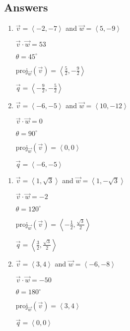 \newpage

\subsection{Answers}

\begin{multicols}{2} \raggedcolumns 

\begin{enumerate}

\item $\vec{v} = \left\langle -2, -7 \right\rangle$ and $\vec{w} = \left\langle 5, -9 \right\rangle$

 $\vec{v} \cdot \vec{w} = 53$

 $\theta =  45^{\circ}$ 

 $\text{proj}_{\vec{w}}(\vec{v}) = \left\langle \frac{5}{2}, -\frac{9}{2} \right\rangle$

 $\vec{q} = \left\langle -\frac{9}{2}, -\frac{5}{2} \right\rangle$
 
 \vfill
 
\item $\vec{v} = \left\langle -6, -5 \right\rangle$ and $\vec{w} = \left\langle 10, -12 \right\rangle$

 $\vec{v} \cdot \vec{w} = 0$

 $\theta =  90^{\circ}$ 

 $\text{proj}_{\vec{w}}(\vec{v}) = \left\langle 0, 0 \right\rangle$

 $\vec{q} = \left\langle -6, -5 \right\rangle$ 

 
\setcounter{HW}{\value{enumi}}
\end{enumerate}
\end{multicols}


\begin{multicols}{2} \raggedcolumns 
\begin{enumerate}
\setcounter{enumi}{\value{HW}}
\item $\vec{v} = \left\langle 1, \sqrt{3} \right\rangle$ and $\vec{w} = \left\langle 1, -\sqrt{3} \right\rangle$

 $\vec{v} \cdot \vec{w} = -2$

 $\theta =  120^{\circ}$ 

 $\text{proj}_{\vec{w}}(\vec{v}) = \left\langle -\frac{1}{2}, \frac{\sqrt{3}}{2} \right\rangle$

 $\vec{q} = \left\langle \frac{3}{2}, \frac{\sqrt{3}}{2} \right\rangle$
 
 \vfill
 
\item $\vec{v} = \left\langle 3,4 \right\rangle$ and $\vec{w} = \left\langle -6, -8 \right\rangle$

 $\vec{v} \cdot \vec{w} = -50$

 $\theta =  180^{\circ}$ 

 $\text{proj}_{\vec{w}}(\vec{v}) = \left\langle 3, 4 \right\rangle$

 $\vec{q} = \left\langle0, 0\right\rangle$ 

 
\setcounter{HW}{\value{enumi}}
\end{enumerate}
\end{multicols}
 
